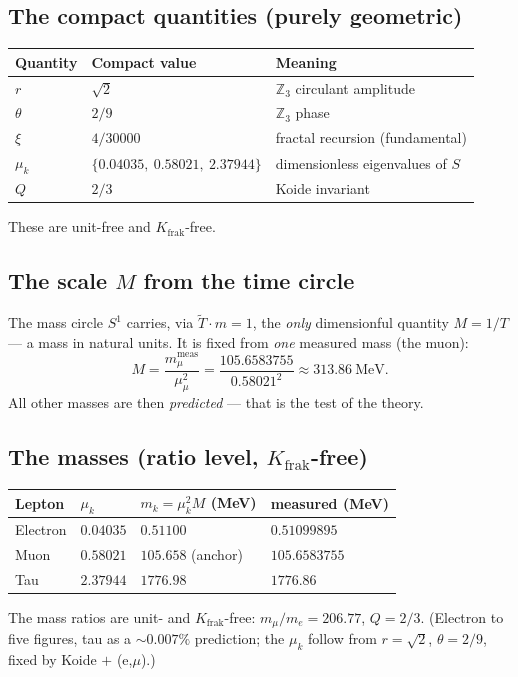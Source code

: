\subsection{The compact quantities (purely geometric)}
\begin{center}
\begin{tabular}{@{}p{1.7cm} p{3.4cm} p{6.4cm}@{}}
\toprule
Quantity & Compact value & Meaning \\
\midrule
$r$ & $\sqrt2$ & $\mathbb{Z}_3$ circulant amplitude \\
$\theta$ & $2/9$ & $\mathbb{Z}_3$ phase \\
$\xi$ & $4/30000$ & fractal recursion (fundamental) \\
$\mu_k$ & $\{0.04035,\ 0.58021,\ 2.37944\}$ & dimensionless eigenvalues of $S$ \\
$Q$ & $2/3$ & Koide invariant \\
\bottomrule
\end{tabular}
\end{center}
These are unit-free and $K_{\text{frak}}$-free.

\subsection{The scale $M$ from the time circle}
The mass circle $S^1$ carries, via $\tilde{T}\cdot m=1$, the \emph{only} dimensionful quantity
$M=1/T$ --- a mass in natural units. It is fixed from \emph{one} measured mass (the muon):
\[
M=\frac{m_\mu^{\text{meas}}}{\mu_\mu^2}=\frac{105.6583755}{0.58021^2}\approx 313.86\ \text{MeV}.
\]
All other masses are then \emph{predicted} --- that is the test of the theory.

\subsection{The masses (ratio level, $K_{\text{frak}}$-free)}
\begin{center}
\begin{tabular}{@{}p{2.2cm} p{1.9cm} p{3.4cm} p{3.4cm}@{}}
\toprule
Lepton & $\mu_k$ & $m_k=\mu_k^2 M$ (MeV) & measured (MeV) \\
\midrule
Electron & $0.04035$ & $0.51100$ & $0.51099895$ \\
Muon & $0.58021$ & $105.658$ (anchor) & $105.6583755$ \\
Tau & $2.37944$ & $1776.98$ & $1776.86$ \\
\bottomrule
\end{tabular}
\end{center}
The mass ratios are unit- and $K_{\text{frak}}$-free: $m_\mu/m_e=206.77$, $Q=2/3$. (Electron to five
figures, tau as a $\sim0.007\%$ prediction; the $\mu_k$ follow from $r=\sqrt2$, $\theta=2/9$, fixed by
Koide $+$ (e,$\mu$).)

